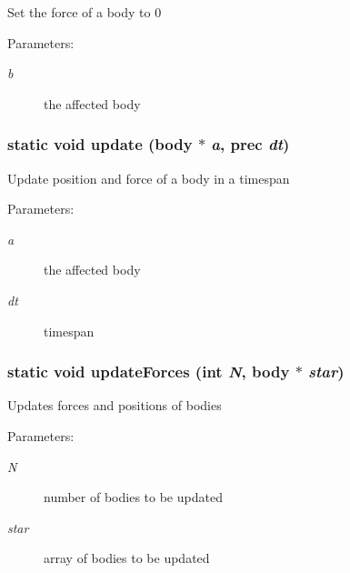 Set the force of a body to 0 \begin{Desc}
\item[Parameters:]
\begin{description}
\item[{\em b}]the affected body \end{description}
\end{Desc}
\hypertarget{main-iter_8c_fc1da57b3f4ebfb1c6f700fe25845bc2}{
\subsubsection[{update}]{\setlength{\rightskip}{0pt plus 5cm}static void update (body $\ast$ {\em a}, \/  prec {\em dt})}}
\label{main-iter_8c_fc1da57b3f4ebfb1c6f700fe25845bc2}


Update position and force of a body in a timespan \begin{Desc}
\item[Parameters:]
\begin{description}
\item[{\em a}]the affected body \item[{\em dt}]timespan \end{description}
\end{Desc}
\hypertarget{main-iter_8c_0225871a22ae8ff450368514791f150e}{
\subsubsection[{updateForces}]{\setlength{\rightskip}{0pt plus 5cm}static void updateForces (int {\em N}, \/  body $\ast$ {\em star})}}
\label{main-iter_8c_0225871a22ae8ff450368514791f150e}


Updates forces and positions of bodies \begin{Desc}
\item[Parameters:]
\begin{description}
\item[{\em N}]number of bodies to be updated \item[{\em star}]array of bodies to be updated \end{description}
\end{Desc}

